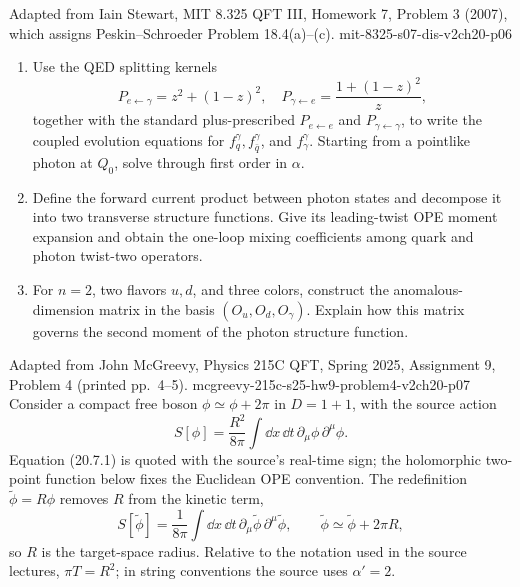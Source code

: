 \begin{enumerate}
  {Adapted from Iain Stewart, MIT 8.325 QFT III, Homework 7, Problem 3
  (2007), which assigns Peskin--Schroeder Problem 18.4(a)--(c).}
  {mit-8325-s07-dis-v2ch20-p06}
  \begin{enumerate}
    \item[(a)] Use the QED splitting kernels
      \[
      P_{e\leftarrow\gamma}=z^2+(1-z)^2,\quad
      P_{\gamma\leftarrow e}=\frac{1+(1-z)^2}{z},
      \]
      together with the standard plus-prescribed
      \(P_{e\leftarrow e}\) and \(P_{\gamma\leftarrow\gamma}\), to write
      the coupled evolution equations for \(f_q^\gamma,f_{\bar q}^\gamma\),
      and \(f_\gamma^\gamma\).  Starting from a pointlike photon at \(Q_0\),
      solve through first order in \(\alpha\).
    \item[(b)] Define the forward current product between photon states and
      decompose it into two transverse structure functions.  Give its
      leading-twist OPE moment expansion and obtain the one-loop mixing
      coefficients among quark and photon twist-two operators.
    \item[(c)] For \(n=2\), two flavors \(u,d\), and three colors, construct
      the anomalous-dimension matrix in the basis
      \((O_u,O_d,O_\gamma)\).  Explain how this matrix governs the second
      moment of the photon structure function.
  \end{enumerate}

  {Adapted from John McGreevy, Physics 215C QFT, Spring 2025,
  Assignment 9, Problem 4 (printed pp.~4--5).}
  {mcgreevy-215c-s25-hw9-problem4-v2ch20-p07}
  Consider a compact free boson \(\phi\simeq\phi+2\pi\) in
  \(D=1+1\), with the source action
  \[
    S[\phi]=\frac{R^2}{8\pi}\int \dd x\,\dd t\,
      \partial_\mu\phi\,\partial^\mu\phi .
    \tag{20.7.1}
  \]
  Equation (20.7.1) is quoted with the source's real-time sign; the
  holomorphic two-point function below fixes the Euclidean OPE
  convention.  The redefinition \(\widetilde\phi=R\phi\) removes \(R\)
  from the kinetic term,
  \[
    S[\widetilde\phi]=\frac{1}{8\pi}\int \dd x\,\dd t\,
      \partial_\mu\widetilde\phi\,\partial^\mu\widetilde\phi ,
    \qquad
    \widetilde\phi\simeq\widetilde\phi+2\pi R,
  \]
  so \(R\) is the target-space radius.  Relative to the notation used in
  the source lectures, \(\pi T=R^2\); in string conventions the source
  uses \(\alpha'=2\).


\end{enumerate}
